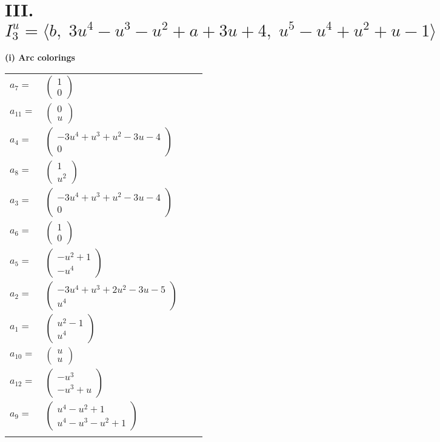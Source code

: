 \documentclass[1p]{elsarticle_modified}
\theoremstyle{definition}
\begin{document}
\centering \section*{III. $I^u_{3}= \langle b,\;3 u^4- u^3- u^2+a+3 u+4,\;u^5- u^4+u^2+u-1 \rangle$}
\flushleft \textbf{(i) Arc colorings}\\
\begin{tabular}{m{7pt} m{180pt} m{7pt} m{180pt} }
\flushright $a_{7}=$&$\begin{pmatrix}1\\0\end{pmatrix}$ \\
\flushright $a_{11}=$&$\begin{pmatrix}0\\u\end{pmatrix}$ \\
\flushright $a_{4}=$&$\begin{pmatrix}-3 u^4+u^3+u^2-3 u-4\\0\end{pmatrix}$ \\
\flushright $a_{8}=$&$\begin{pmatrix}1\\u^2\end{pmatrix}$ \\
\flushright $a_{3}=$&$\begin{pmatrix}-3 u^4+u^3+u^2-3 u-4\\0\end{pmatrix}$ \\
\flushright $a_{6}=$&$\begin{pmatrix}1\\0\end{pmatrix}$ \\
\flushright $a_{5}=$&$\begin{pmatrix}- u^2+1\\- u^4\end{pmatrix}$ \\
\flushright $a_{2}=$&$\begin{pmatrix}-3 u^4+u^3+2 u^2-3 u-5\\u^4\end{pmatrix}$ \\
\flushright $a_{1}=$&$\begin{pmatrix}u^2-1\\u^4\end{pmatrix}$ \\
\flushright $a_{10}=$&$\begin{pmatrix}u\\u\end{pmatrix}$ \\
\flushright $a_{12}=$&$\begin{pmatrix}- u^3\\- u^3+u\end{pmatrix}$ \\
\flushright $a_{9}=$&$\begin{pmatrix}u^4- u^2+1\\u^4- u^3- u^2+1\end{pmatrix}$\\&\end{tabular}
\end{document}

